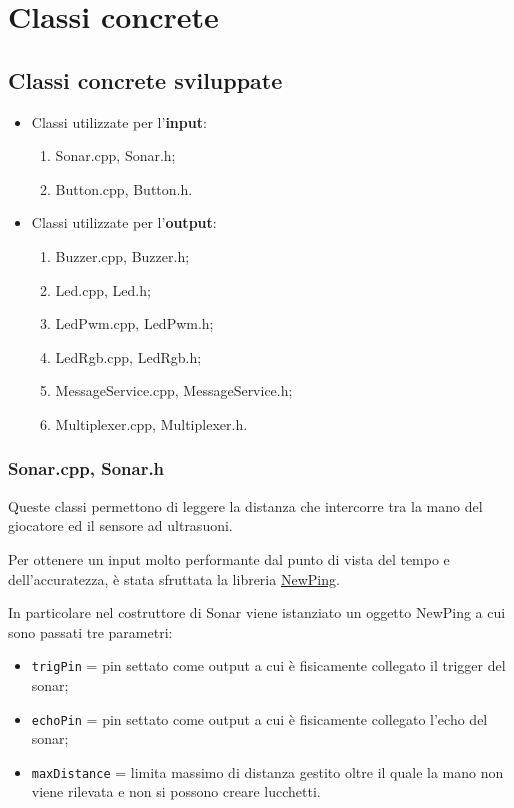 \chapter{Classi concrete}
\section{Classi concrete sviluppate}
\begin{itemize}
	\item Classi utilizzate per l'\textbf{input}:
	\begin{enumerate}
		\item Sonar.cpp, Sonar.h;
		\item Button.cpp, Button.h.
	\end{enumerate}
	\item Classi utilizzate per l'\textbf{output}:
	\begin{enumerate}
		\item Buzzer.cpp, Buzzer.h;
		\item Led.cpp, Led.h;
		\item LedPwm.cpp, LedPwm.h;
		\item LedRgb.cpp, LedRgb.h;
		\item MessageService.cpp, MessageService.h;
		\item Multiplexer.cpp, Multiplexer.h.
	\end{enumerate}
\end{itemize}

\subsection{Sonar.cpp, Sonar.h}
Queste classi permettono di leggere la distanza che intercorre tra la mano del giocatore ed il sensore ad ultrasuoni.

Per ottenere un input molto performante dal punto di vista del tempo e dell'accuratezza, è stata sfruttata la libreria \href{http://playground.arduino.cc/Code/NewPing}{NewPing}.

In particolare nel costruttore di Sonar viene istanziato un oggetto NewPing a cui sono passati tre parametri:
\begin{itemize}
	\item \texttt{trigPin} = pin settato come output a cui è fisicamente collegato il trigger del sonar;
	\item \texttt{echoPin} = pin settato come output a cui è fisicamente collegato l'echo del sonar;
	\item \texttt{maxDistance} = limita massimo di distanza gestito oltre il quale la mano non viene rilevata e non si possono creare lucchetti.
\end{itemize}

